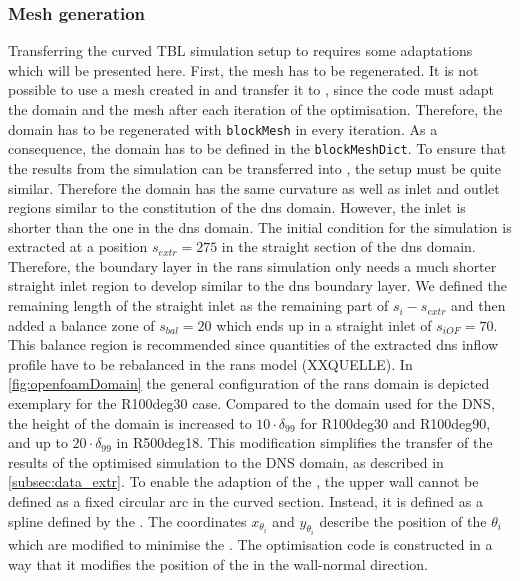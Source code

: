 
\subsubsection{Mesh generation}
Transferring the curved TBL simulation setup to  requires some adaptations which will be presented here. 
First, the mesh has to be regenerated. 
It is not possible to use a mesh created in  and transfer it to , since the code must adapt the domain and the mesh after each iteration of the optimisation.
Therefore, the domain has to be regenerated with \verb|blockMesh| in every iteration.
As a consequence, the domain has to be defined in the \verb|blockMeshDict|.
To ensure that the results from the  simulation can be transferred into , the setup must be quite similar.
Therefore the domain has the same curvature as well as  inlet and outlet regions similar to the constitution of the \acrshort{dns} domain.
However, the inlet is shorter than the one in the \acrshort{dns} domain.
The initial condition for the  simulation is extracted at a position $s_{extr} = 275$ in the straight section of the \acrshort{dns} domain.
Therefore, the boundary layer in the \acrshort{rans} simulation only needs a much shorter straight inlet region to develop similar to the \acrshort{dns} boundary layer.
We defined the remaining length of the straight inlet as the remaining part of $s_{i} - s_{extr}$ and then added a balance zone of $s_{bal} = 20$ which ends up in a straight inlet of $s_{iOF} = 70$.
This balance region is recommended since quantities of the extracted \acrshort{dns} inflow profile have to be rebalanced in the \acrshort{rans} model (XXQUELLE).
In \autoref{fig:openfoamDomain} the general configuration of the \acrshort{rans} domain is depicted exemplary for the R100deg30 case.
Compared to the domain used for the DNS, the height of the domain is increased to $10 \cdot \delta_{99}$ for R100deg30 and R100deg90, and up to $20 \cdot \delta_{99}$ in R500deg18.
This modification simplifies the transfer of the results of the optimised  simulation to the DNS domain, as  described in \autoref{subsec:data_extr}.
To enable the adaption of the , the upper wall cannot be defined as a fixed circular arc in the curved section.
Instead, it is defined as a spline defined by the .
The coordinates $x_{\theta_i}$ and $y_{\theta_i}$  describe the position of the  $\theta_i$ which are modified to minimise the .  
The optimisation code is constructed in a way that it modifies the position of the  in the wall-normal direction. 


